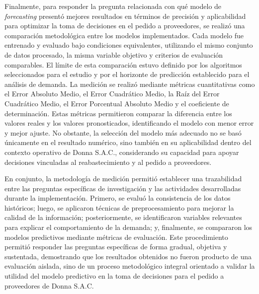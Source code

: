 Finalmente, para responder la pregunta relacionada con qué modelo de \textit{forecasting} presentó mejores 
resultados en términos de precisión y aplicabilidad para optimizar la toma de decisiones en el pedido a 
proveedores, se realizó una comparación metodológica entre los modelos implementados. Cada modelo fue entrenado 
y evaluado bajo condiciones equivalentes, utilizando el mismo conjunto de datos procesado, la misma variable 
objetivo y criterios de evaluación comparables. El límite de esta comparación estuvo definido por los algoritmos 
seleccionados para el estudio y por el horizonte de predicción establecido para el análisis de demanda. 
La medición se realizó mediante métricas cuantitativas como el Error Absoluto Medio, el Error Cuadrático Medio, 
la Raíz del Error Cuadrático Medio, el Error Porcentual Absoluto Medio y el coeficiente de determinación. Estas 
métricas permitieron comparar la diferencia entre los valores reales y los valores pronosticados, identificando 
el modelo con menor error y mejor ajuste. No obstante, la selección del modelo más adecuado no se basó únicamente 
en el resultado numérico, sino también en su aplicabilidad dentro del contexto operativo de Donna S.A.C., 
considerando su capacidad para apoyar decisiones vinculadas al reabastecimiento y al pedido a proveedores.

En conjunto, la metodología de medición permitió establecer una trazabilidad entre las preguntas específicas de 
investigación y las actividades desarrolladas durante la implementación. Primero, se evaluó la consistencia de 
los datos históricos; luego, se aplicaron técnicas de preprocesamiento para mejorar la calidad de la información; 
posteriormente, se identificaron variables relevantes para explicar el comportamiento de la demanda; y, 
finalmente, se compararon los modelos predictivos mediante métricas de evaluación. Este procedimiento permitió 
responder las preguntas específicas de forma gradual, objetiva y sustentada, demostrando que los resultados 
obtenidos no fueron producto de una evaluación aislada, sino de un proceso metodológico integral orientado a 
validar la utilidad del modelo predictivo en la toma de decisiones para el pedido a proveedores de Donna S.A.C.



